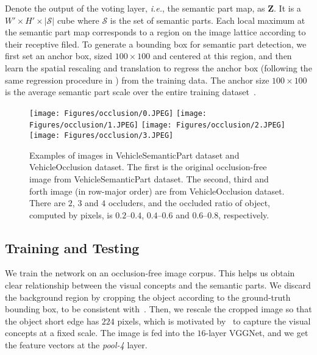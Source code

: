 \documentclass[10pt,twocolumn,letterpaper]{article}
\begin{document}
  Denote the output of the voting layer, {\em i.e.}, the semantic part map, as $\mathbf{Z}$. It is a $W'\times H'\times\left|\mathcal{S}\right|$ cube where $\mathcal{S}$ is the set of semantic parts. Each local maximum at the semantic part map corresponds to a region on the image lattice according to their receptive filed. To generate a bounding box for semantic part detection, we first set an anchor box, sized $100\times100$ and centered at this region, and then learn the spatial rescaling and translation to regress the anchor box (following the same regression procedure in \cite{Girshick_2015_Fast}) from the training data. The anchor size $100\times100$ is the average semantic part scale over the entire training dataset~\cite{wang2017detecting}.

  \begin{figure*}[t!]
  \centering
  \texttt{[image: Figures/occlusion/0.JPEG]} \hfill
  \texttt{[image: Figures/occlusion/1.JPEG]} \hfill
  \texttt{[image: Figures/occlusion/2.JPEG]} \hfill
  \texttt{[image: Figures/occlusion/3.JPEG]}
  \caption{
  Examples of images in VehicleSemanticPart dataset and VehicleOcclusion dataset. The first is the original occlusion-free image from VehicleSemanticPart dataset. The second, third and forth image (in row-major order) are from VehicleOcclusion dataset. There are $2$, $3$ and $4$ occluders, and the occluded ratio of object, computed by pixels, is $0.2$--$0.4$, $0.4$--$0.6$ and $0.6$--$0.8$, respectively.
  }
  \label{Fig:Occlusion}
  \end{figure*}


  \subsection{Training and Testing}
  \label{Framework:Details}

  We train the network on an occlusion-free image corpus. This helps us obtain clear relationship between the visual concepts and the semantic parts. We discard the background region by cropping the object according to the ground-truth bounding box, to be consistent with~\cite{wang2017detecting}. Then, we rescale the cropped image so that the object short edge has $224$ pixels, which is motivated by~\cite{Wang_2017_VC_journal} to capture the visual concepts at a fixed scale. The image is fed into the $16$-layer VGGNet, and we get the feature vectors at the {\em pool-4} layer.
\end{document}

